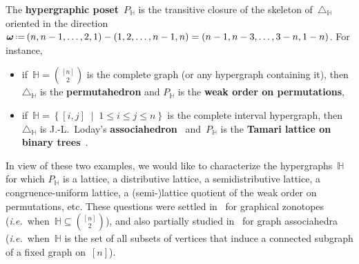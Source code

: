 \documentclass{amsart}
\theoremstyle{definition}
\renewcommand{\b}[1]{\boldsymbol{#1}} %
\newcommand{\set}[2]{\left\{ #1 \;\middle|\; #2 \right\}} %
\newcommand{\eqdef}{\mbox{\,\raisebox{0.2ex}{\scriptsize\ensuremath{\mathrm:}}\ensuremath{=}\,}} %
\newcommand{\simplex}{\triangle} %
\newcommand{\ie}{\textit{i.e.}~} %
\newcommand{\defn}[1]{\textbf{\textsf{\color{PineGreen} #1}}} %
\newcommand{\HH}{\mathbb H}  %
\begin{document}
The \defn{hypergraphic poset}~$P_\HH$ is the transitive closure of the skeleton of~$\simplex_\HH$ oriented in the direction~$\b{\omega} \eqdef (n, n-1, \dots, 2, 1) - (1, 2, \dots, n-1, n) = (n-1, n-3, \dots, 3-n, 1-n)$.
For instance, 
\begin{itemize}
\item if~$\HH = \binom{[n]}{2}$ is the complete graph (or any hypergraph containing it), then~$\simplex_\HH$ is the \defn{permutahedron} and $P_\HH$ is the \defn{weak order on permutations},
\item if~$\HH = \set{[i,j]}{1 \le i \le j \le n}$ is the complete interval hypergraph, then~$\simplex_\HH$ is \mbox{J.-L.~Loday's} \defn{associahedron}~\cite{ShniderSternberg,Loday} and~$P_\HH$ is the \defn{Tamari lattice on binary trees}~\cite{Tamari}.
\end{itemize}

In view of these two examples, we would like to characterize the hypergraphs~$\HH$ for which $P_\HH$ is a lattice, a distributive lattice, a semidistributive lattice, a congruence-uniform lattice, a \mbox{(semi-)lattice} quotient of the weak order on permutations, etc.
These questions were settled in~\cite{Pilaud-acyclicReorientationLattices} for graphical zonotopes (\ie when~$\HH \subseteq \binom{[n]}{2}$), and also partially studied in~\cite{BarnardMcConville} for graph associahedra~\cite{CarrDevadoss} (\ie when~$\HH$ is the set of all subsets of vertices that induce a connected subgraph of a fixed graph on~$[n]$).
\end{document}
